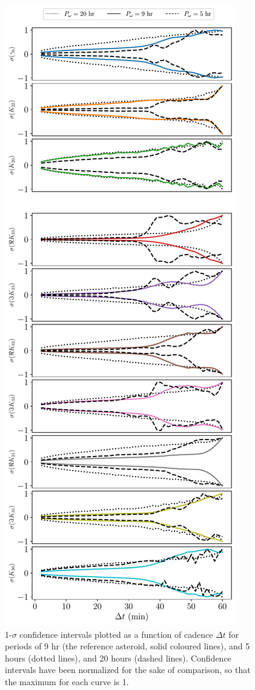 \documentclass[fleqn,usenatbib]{mnras}
\begin{document}
\begin{figure}
  \centering
  \includegraphics[height=0.89\textheight]{figs/cad-period.pdf}
  \caption{1-$\sigma$ confidence intervals plotted as a function of cadence $\Delta t$ for periods of 9 hr (the reference asteroid, solid coloured lines), and 5 hours (dotted lines), and 20 hours (dashed lines). Confidence intervals have been normalized for the sake of comparison, so that the maximum for each curve is 1.}
  \label{fig:cad-period}
\end{figure}
\end{document}
